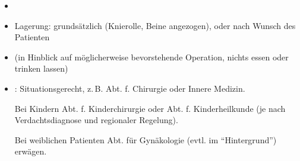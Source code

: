\label{m:am-abdominalerkrankungen}
\begin{itemize}
  \item {} \TxBeiVit
  \TxMassVitMK
  \item Lagerung: grundsätzlich 
  (Knierolle, Beine angezogen), oder nach Wunsch des Patienten
  \item {} (in Hinblick auf möglicherweise
  bevorstehende Operation, nichts essen oder trinken lassen)
  \item {}: Situationsgerecht,
  z.\,B. Abt. f. Chirurgie oder Innere Medizin.
  
  Bei Kindern Abt. f. Kinderchirurgie oder Abt. f.
  Kinderheilkunde (je nach Verdachtsdiagnose und regionaler
  Regelung).
  
  Bei weiblichen Patienten Abt. für Gynäkologie (evtl. im
  \enquote{Hintergrund}) erwägen.
\end{itemize}